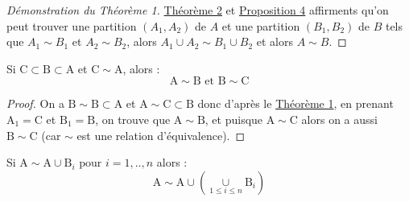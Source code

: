 \begin{proof}[Démonstration du Théorème 1]
  \hyperref[T2]{Théorème 2} et \hyperref[p4]{Proposition 4} affirments qu'on peut trouver une partition $(A_1, A_2)$ de $A$ et une partition $(B_1, B_2)$ de $B$ tels que $A_1 \sim B_1$ et $A_2 \sim B_2$, alors $A_1 \cup A_2 \sim B_1 \cup B_2$ et alors $A \sim B$.
\end{proof}
\begin{Co}\label{c2}
  Si $\mathrm{C} \subset \mathrm{B} \subset \mathrm{A}$ et $\mathrm{C} \sim \mathrm{A}$, alors :
  $$\mathrm{A} \sim \mathrm{B} \text{ et } \mathrm{B} \sim \mathrm{C}$$
\end{Co}
\begin{proof}
On a $\mathrm{B} \sim \mathrm{B} \subset \mathrm{A}$ et $\mathrm{A} \sim \mathrm{C} \subset \mathrm{B}$ donc d'après le \hyperref[T1]{Théorème 1}, en prenant $\mathrm{A}_1 = \mathrm{C}$ et $\mathrm{B}_1=\mathrm{B}$, on trouve que $\mathrm{A} \sim \mathrm{B}$, et puisque $\mathrm{A} \sim \mathrm{C}$ alors on a aussi $\mathrm{B} \sim \mathrm{C}$ (car $\sim$ est une relation d'équivalence).
\end{proof}
\begin{PR}\label{pr5}
  Si $\mathrm{A} \sim \mathrm{A} \cup \mathrm{B}_i \text{ pour }i=1,..,n $ alors :
  $$\mathrm{A} \sim \mathrm{A} \cup \left(\underset{1\le i \le n}{\cup}\mathrm{B}_i\right)$$
\end{PR}
